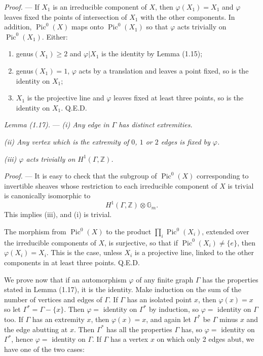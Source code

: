 \documentclass[10pt]{article}
\newcommand{\Pic}{\operatorname{Pic}}
\newcommand{\QED}{\hfill Q.E.D.}
\begin{document}
\noindent\emph{Proof.} --- If $X_1$ is an irreducible component of $X$, then $\varphi(X_1)=X_1$ and $\varphi$ leaves fixed the points of intersection of $X_1$ with the other components. In addition, $\Pic^0(X)$ maps onto $\Pic^0(X_1)$ so that $\varphi$ acts trivially on $\Pic^0(X_1)$. Either:
\begin{enumerate}[label=\emph{\alph*)}]
\item genus$(X_1)\geq2$ and $\varphi|X_1$ is the identity by Lemma (1.15);
\item genus$(X_1)=1$, $\varphi$ acts by a translation and leaves a point fixed, so is the identity on $X_1$;
\item $X_1$ is the projective line and $\varphi$ leaves fixed at least three points, so is the identity on $X_1$. \QED
\end{enumerate}

\medskip
\noindent\emph{Lemma (1.17).} --- \emph{(i) Any edge in $\Gamma$ has distinct extremities.}

\emph{(ii) Any vertex which is the extremity of $0$, $1$ or $2$ edges is fixed by $\varphi$.}

\emph{(iii) $\varphi$ acts trivially on $H^1(\Gamma,\mathbb Z)$.}

\noindent\emph{Proof.} --- It is easy to check that the subgroup of $\Pic^0(X)$ corresponding to invertible sheaves whose restriction to each irreducible component of $X$ is trivial is canonically isomorphic to
\[
H^1(\Gamma,\mathbb Z)\otimes\mathbb G_m.
\]
This implies (iii), and (i) is trivial.

The morphism from $\Pic^0(X)$ to the product $\prod_i\Pic^0(X_i)$, extended over the irreducible components of $X$, is surjective, so that if $\Pic^0(X_i)\neq\{e\}$, then $\varphi(X_i)=X_i$. This is the case, unless $X_i$ is a projective line, linked to the other components in at least three points. \QED

We prove now that if an automorphism $\varphi$ of any finite graph $\Gamma$ has the properties stated in Lemma (1.17), it is the identity. Make induction on the sum of the number of vertices and edges of $\Gamma$. If $\Gamma$ has an isolated point $x$, then $\varphi(x)=x$ so let $\Gamma^*=\Gamma-\{x\}$. Then $\varphi=$ identity on $\Gamma^*$ by induction, so $\varphi=$ identity on $\Gamma$ too. If $\Gamma$ has an extremity $x$, then $\varphi(x)=x$, and again let $\Gamma^*$ be $\Gamma$ minus $x$ and the edge abutting at $x$. Then $\Gamma^*$ has all the properties $\Gamma$ has, so $\varphi=$ identity on $\Gamma^*$, hence $\varphi=$ identity on $\Gamma$. If $\Gamma$ has a vertex $x$ on which only 2 edges abut, we have one of the two cases:
\end{document}
